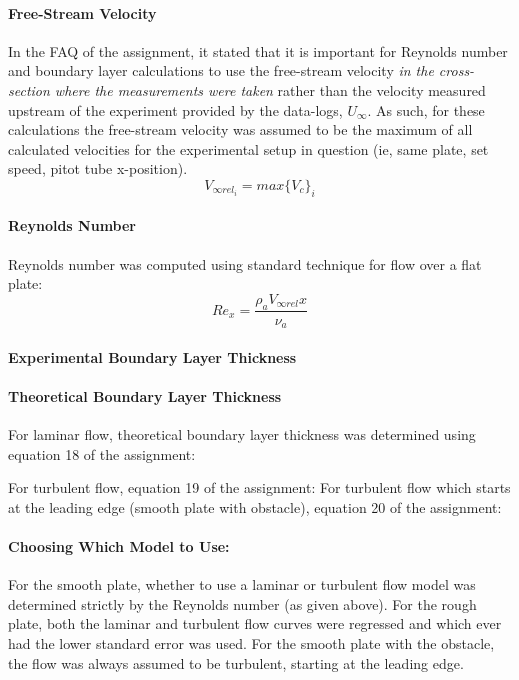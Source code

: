 \documentclass[12pt]{article}
\begin{document}
	\paragraph{Free-Stream Velocity} In the FAQ of the assignment, it stated that it is important for Reynolds number and boundary layer calculations to use the free-stream velocity \textit{in the cross-section where the measurements were taken} rather than the velocity measured upstream of the experiment provided by the data-logs, $U_\infty$.\hfill\break
	As such, for these calculations the free-stream velocity was assumed to be the maximum of all calculated velocities for the experimental setup in question (ie, same plate, set speed, pitot tube x-position).
	\begin{equation}
		V_{\infty rel_i} = max\{V_c\}_i
	\end{equation}
	\paragraph{Reynolds Number} Reynolds number was computed using standard technique for flow over a flat plate:
	\begin{equation}
		Re_x = \frac{\rho_a V_{\infty rel} x}{\nu_a}
	\end{equation}
	
	\paragraph{Experimental Boundary Layer Thickness}
	
	\paragraph{Theoretical Boundary Layer Thickness}
	For laminar flow, theoretical boundary layer thickness was determined using equation 18 of the assignment:
	
	\hfill\break
	For turbulent flow, equation 19 of the assignment:
	\hfill\break
	For turbulent flow which starts at the leading edge (smooth plate with obstacle), equation 20 of the assignment:
	
	\paragraph{Choosing Which Model to Use:} For the smooth plate, whether to use a laminar or turbulent flow model was determined strictly by the Reynolds number (as given above). For the rough plate, both the laminar and turbulent flow curves were regressed and which ever had the lower standard error was used. For the smooth plate with the obstacle, the flow was always assumed to be turbulent, starting at the leading edge.
	
	
\end{document}
